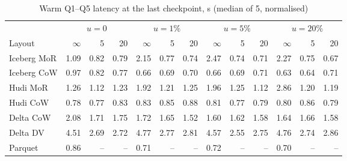 \documentclass[conference]{IEEEtran}
\begin{document}
\begin{table}[!t]\centering
\caption{Warm Q1--Q5 latency at the last checkpoint, s (median of 5, normalised)}\label{tab:a-read}
\footnotesize
\begin{tabular}{@{}lrrrrrrrrrrrr@{}}\toprule
 & \multicolumn{3}{c}{$u=0$} & \multicolumn{3}{c}{$u=1\%$} & \multicolumn{3}{c}{$u=5\%$} & \multicolumn{3}{c}{$u=20\%$}\\
\cmidrule(lr){2-4}\cmidrule(lr){5-7}\cmidrule(lr){8-10}\cmidrule(lr){11-13}
Layout & $\infty$ & 5 & 20 & $\infty$ & 5 & 20 & $\infty$ & 5 & 20 & $\infty$ & 5 & 20\\\midrule
Iceberg MoR & 1.09 & 0.82 & 0.79 & 2.15 & 0.77 & 0.74 & 2.47 & 0.74 & 0.71 & 2.27 & 0.75 & 0.67\\
Iceberg CoW & 0.97 & 0.82 & 0.77 & 0.66 & 0.69 & 0.70 & 0.66 & 0.69 & 0.71 & 0.63 & 0.64 & 0.71\\
Hudi MoR & 1.26 & 1.12 & 1.23 & 1.92 & 1.21 & 1.25 & 1.96 & 1.25 & 1.12 & 2.86 & 1.20 & 1.19\\
Hudi CoW & 0.78 & 0.77 & 0.83 & 0.83 & 0.85 & 0.88 & 0.81 & 0.77 & 0.79 & 0.80 & 0.86 & 0.79\\
Delta CoW & 2.08 & 1.71 & 1.75 & 1.72 & 1.65 & 1.52 & 1.60 & 1.62 & 1.58 & 1.64 & 1.66 & 1.58\\
Delta DV & 4.51 & 2.69 & 2.72 & 4.77 & 2.77 & 2.81 & 4.57 & 2.55 & 2.75 & 4.76 & 2.74 & 2.86\\
Parquet & 0.86 & -- & -- & 0.71 & -- & -- & 0.72 & -- & -- & 0.70 & -- & --\\\bottomrule
\end{tabular}
\end{table}
\end{document}
